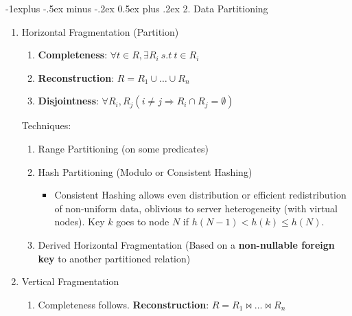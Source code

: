 \documentclass[8pt, landscape]{extarticle}
\makeatletter
\renewcommand{\subsection}{\@startsection{subsection}{2}{0mm}%
  {-1explus -.5ex minus -.2ex}%
  {0.5ex plus .2ex}%
{\normalfont\normalsize\bfseries}}
\makeatother
\begin{document}
\raggedright
\footnotesize
\begin{multicols*}{4}
  \setlength{\columnseprule}{0.25pt}

  \begin{center}
  \end{center}
  \subsection{2. Data Partitioning}
        \begin{enumerate}
            \item Horizontal Fragmentation (Partition)
            \begin{enumerate}
                \item \textbf{Completeness}: $\forall t \in R, \exists R_i \ s.t \ t \in R_i$
                \item \textbf{Reconstruction}: $R = R_1 \cup \dots \cup R_n$
                \item \textbf{Disjointness}: $\forall R_i, R_j (i \neq j \Rightarrow R_i \cap R_j = \emptyset)$
            \end{enumerate}
            Techniques:
            \begin{enumerate}
                \item Range Partitioning (on some predicates)
                \item Hash Partitioning (Modulo or Consistent Hashing)
                \begin{itemize}
                    \item Consistent Hashing allows even distribution or efficient redistribution of non-uniform data, oblivious to server heterogeneity (with virtual nodes). Key $k$ goes to node $N$ if $h(N-1) < h(k) \leq h(N)$.
                \end{itemize}
                \item Derived Horizontal Fragmentation (Based on a \textbf{non-nullable foreign key} to another partitioned relation)
            \end{enumerate}
            \item Vertical Fragmentation
            \begin{enumerate}
                \item Completeness follows. \textbf{Reconstruction}: $R = R_1 \bowtie \dots \bowtie R_n$

\end{enumerate}
\end{enumerate}
\end{multicols*}
\end{document}
